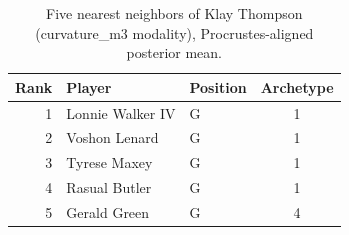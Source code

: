 \begin{table}[htbp]
  \centering\small
  \begin{tabular}{rllc}
    \toprule
    Rank & Player & Position & Archetype \\
    \midrule
    1 & Lonnie Walker IV & G & 1 \\
    2 & Voshon Lenard & G & 1 \\
    3 & Tyrese Maxey & G & 1 \\
    4 & Rasual Butler & G & 1 \\
    5 & Gerald Green & G & 4 \\
    \bottomrule
  \end{tabular}
  \caption{Five nearest neighbors of Klay Thompson (curvature_m3 modality), Procrustes-aligned posterior mean.}
  \label{tab:Klay_Thompson_neighbors_curvature_m3}
\end{table}

